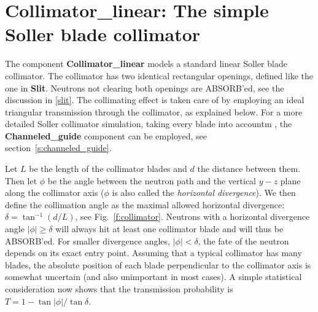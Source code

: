 \section{Collimator\_linear: The simple Soller blade collimator}


The component {\bf Collimator\_linear} 
models a standard linear Soller blade collimator.
The collimator has two identical rectangular openings,
defined like the one in {\bf Slit}. Neutrons not clearing both
openings are ABSORB'ed, see the discussion in \ref{slit}.
The collimating effect is taken care of by employing an ideal
triangular transmission through the collimator, as explained below.
For a more detailed Soller collimator simulation,
taking every blade into accountm , the {\bf Channeled\_guide}
component can be employed, see section~\ref{s:channeled_guide}.

Let $L$ be the length of the collimator blades
and $d$ the distance between them.
Then let $\phi$ be the angle between the 
neutron path and the vertical $y-z$ plane along the collimator axis 
($\phi$ is also called the {\em horizontal divergence}).
We then define the collimation angle as the maximal allowed
horizontal divergence: $\delta = \tan^{-1}(d/L)$,
see Fig.~\ref{f:collimator}. Neutrons with a horizontal
divergence angle $|\phi| \geq \delta$ will always
hit at least one collimator blade and will thus be ABSORB'ed.
For smaller divergence angles, $|\phi| < \delta$, the fate of the
neutron depends on its exact entry point.
Assuming that a typical collimator has many blades, the
absolute position of each blade perpendicular to the collimator axis
is somewhat uncertain (and also unimportant in most cases).
A simple statistical consideration now shows that the transmission
probability is $T = 1-\tan|\phi|/\tan\delta$.

